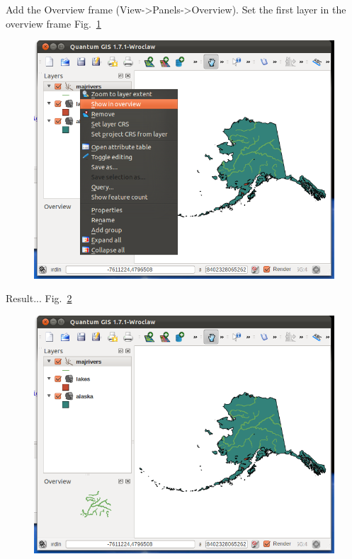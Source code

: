 Add the Overview frame (View->Panels->Overview). Set the first layer in the overview frame Fig.~\ref{fig:qgis006}

\begin{figure}[htbp]
   \centering
   \includegraphics[scale=0.35]{qgis006.png}
   \caption{}
   \label{fig:qgis006}
\end{figure}

Result... Fig.~\ref{fig:qgis007}

\begin{figure}[htbp]
   \centering
   \includegraphics[scale=0.35]{qgis007.png}
   \caption{}
   \label{fig:qgis007}
\end{figure}

